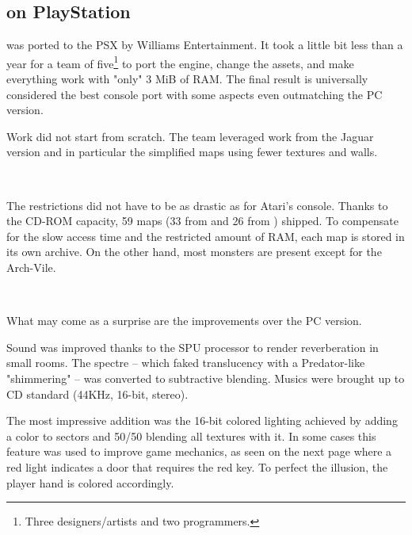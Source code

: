 \subsection{\doom{} on PlayStation}
\doom{} was ported to the PSX by Williams Entertainment. It took a little bit less than a year for a team of five\footnote{Three designers/artists and two programmers.} to port the engine, change the assets, and make everything work with "only" 3 MiB of RAM. The final result is universally considered the best console port with some aspects even outmatching the PC version.\\
\par
Work did not start from scratch. The team leveraged work from the Jaguar version and in particular the simplified maps using fewer textures and walls.\\
\par
{}\\
\par
  The restrictions did not have to be as drastic as for Atari's console. Thanks to the CD-ROM capacity, 59 maps (33 from \doom{} and 26 from \doomii{}) shipped. To compensate for the slow access time and the restricted amount of RAM, each map is stored in its own  archive. On the other hand, most monsters are present except for the Arch-Vile.\\
\par
{}\\
\par
What may come as a surprise are the improvements over the PC version.\\
\par
Sound was improved thanks to the SPU processor to render reverberation in small rooms. The spectre -- which faked translucency with a Predator-like "shimmering" -- was converted to subtractive blending. Musics were brought up to CD standard (44KHz, 16-bit, stereo).\\
\par
 The most impressive addition was the 16-bit colored lighting achieved by adding a color to sectors and 50/50 blending all textures with it. In some cases this feature was used to improve game mechanics, as seen on the next page where a red light indicates a door that requires the red key. To perfect the illusion, the player hand is colored accordingly.\\
\par


